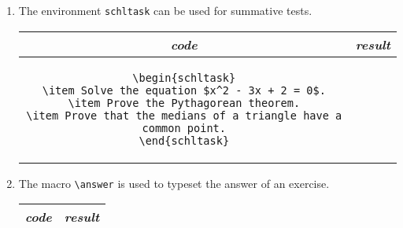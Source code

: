 \documentclass[12pt,a4page]{article}
\begin{document}
\begin{enumerate}
\begin{center}
\begin{tabular}{c|p{}}
\begin{exercise}
                       \end{exercise}
    \end{tabular}
  \end{center}
\item The environment \texttt{schltask} can be used for summative tests.
    \begin{center}
    \footnotesize
    \begin{tabular}{c|p{}}
      \textit{\large code} & \hfill\textit{\large result}\hfill\phantom{.} \\ \hline
      \begin{minipage}[t]{0.4\textwidth}
\begin{lstlisting}
\begin{schltask}
\item Solve the equation $x^2 - 3x + 2 = 0$.
\item Prove the Pythagorean theorem.
\item Prove that the medians of a triangle have a common point.
\end{schltask}
        \end{lstlisting}
      \end{minipage} &
                       \begin{schltask}
                       \item Solve the equation $x^2 - 3x + 2 = 0$.
                       \item Prove the Pythagorean theorem.
                       \item Prove that the medians of a triangle have a common point.
                       \end{schltask}
    \end{tabular}
  \end{center}
\item The macro \verb/\answer/ is used to typeset the answer of an exercise.
    \begin{center}
    \footnotesize
    \begin{tabular}{c|p{}}
      \textit{\large code} & \hfill\textit{\large result}\hfill\phantom{.} \\ \hline

\end{tabular}
\end{center}
\end{enumerate}
\end{document}
